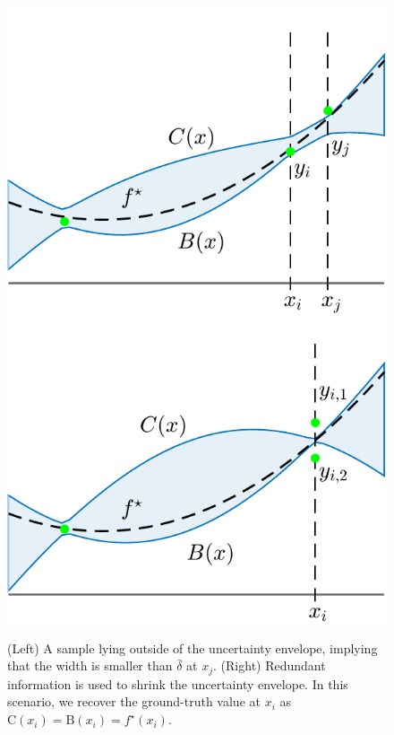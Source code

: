 \begin{figure}[b]
	\centering
	\includegraphics[scale=0.5]{../images/chap2_width_A.pdf} \hspace{8pt}
	\includegraphics[scale=0.5]{../images/chap2_width_B.pdf}
	\caption{(Left) A sample lying outside of the uncertainty envelope, implying that the width is smaller than $\bar \delta$ at $x_j$. (Right) Redundant information is used to shrink the uncertainty envelope. In this scenario, we recover the ground-truth value at $x_i$ as $\text{C}(x_i) = \text{B}(x_i) = f^\star(x_i)$.}
	\label{fig.riskBound}
\end{figure}

